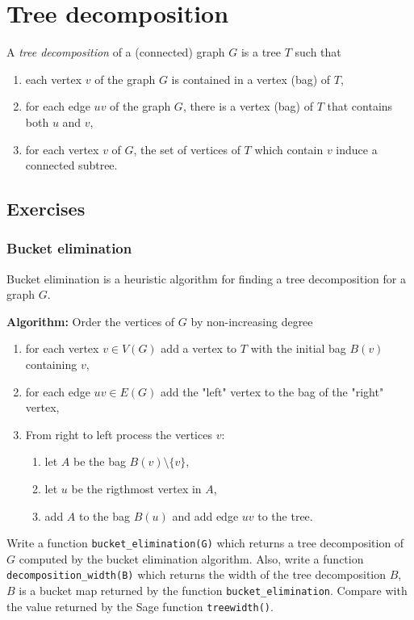 \chapter{Tree decomposition}

A \emph{tree decomposition} of a (connected) graph $G$ is a tree $T$ such that
\begin{enumerate}
    \item each vertex $v$ of the graph $G$ is contained in a vertex (bag) of $T$,
    \item for each edge $uv$ of the graph $G$, there is a vertex (bag) of $T$ that contains both $u$ and $v$,
    \item for each vertex $v$ of $G$, the set of vertices of $T$ which contain $v$ induce a connected subtree.
\end{enumerate}

\section{Exercises}

\subsection{Bucket elimination}

Bucket elimination is a heuristic algorithm for finding a tree decomposition for a graph $G$.

\medskip
\noindent \textbf{Algorithm:}
Order the vertices of $G$ by non-increasing degree
\begin{enumerate}
    \item for each vertex $v \in V(G)$ add a vertex to $T$ with the initial bag $B(v)$ containing $v$,
    \item for each edge $uv \in E(G)$ add the "left" vertex to the bag of the "right" vertex,
    \item From right to left process the vertices $v$:
    \begin{enumerate}
        \item let $A$ be the bag $B(v) \setminus \{v\}$,
        \item let $u$ be the rigthmost vertex in $A$,
        \item add $A$ to the bag $B(u)$ and add  edge $uv$ to the tree.
    \end{enumerate}
\end{enumerate}

Write a function \verb`bucket_elimination(G)` which returns a tree decomposition of $G$ computed by the bucket elimination algorithm.
Also, write a function \verb`decomposition_width(B)` which returns the width of the tree decomposition $B$, $B$ is a bucket map returned by the function \verb`bucket_elimination`. Compare with the value returned by the Sage function \verb`treewidth()`.

